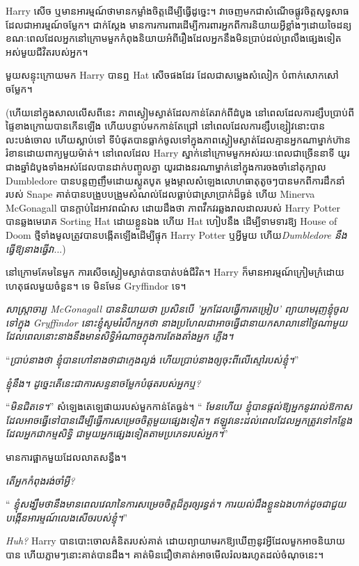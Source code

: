 {{{{{Harry សើច ឬមានអារម្មណ៍ថាមានកម្លាំងចិត្តដើម្បីធ្វើដូច្នេះ។ វាចេញមកជាសំណើចផ្លូវចិត្តសុទ្ធសាធ ដែលជាអារម្មណ៍ចម្លែក។ ជាក់ស្តែង មានការការពារដើម្បីការពារអ្នកពីការនិយាយអ្វីខ្លាំងៗដោយចៃដន្យ ខណៈពេលដែលអ្នកនៅក្រោមមួកកំពុងនិយាយអំពីរឿងដែលអ្នកនឹងមិនប្រាប់ដល់ព្រលឹងផ្សេងទៀតអស់មួយជីវិតរបស់អ្នក។

មួយសន្ទុះក្រោយមក Harry បានឮ Hat សើចផងដែរ ដែលជាសម្លេងសំលៀក បំពាក់សោកសៅចម្លែក។

(ហើយនៅក្នុងសាលលើសពីនេះ ភាពស្ងៀមស្ងាត់ដែលកាន់តែរាក់ពីដំបូង នៅពេលដែលការខ្សឹបប្រាប់ពីផ្ទៃខាងក្រោយបានកើនឡើង ហើយបន្ទាប់មកកាន់តែជ្រៅ នៅពេលដែលការខ្សឹបខ្សៀវនោះបានលះបង់ចោល ហើយស្លាប់ទៅ ទីបំផុតបានធ្លាក់ចូលទៅក្នុងភាពស្ងៀមស្ងាត់ដែលគ្មានអ្នកណាម្នាក់ហ៊ានរំខានដោយពាក្យមួយម៉ាត់។ នៅពេលដែល Harry ស្នាក់នៅក្រោមមួកអស់រយៈពេលជាច្រើននាទី យូរជាងឆ្នាំដំបូងទាំងអស់ដែលបានដាក់បញ្ចូលគ្នា យូរជាងនរណាម្នាក់នៅក្នុងការចងចាំនៅតុក្បាល Dumbledore បានបន្តញញឹមដោយស្លូតបូត ម្តងម្កាលសំឡេងលោហធាតុតូចៗបានមកពីការដឹកនាំរបស់ Snape គាត់បានបង្រួបបង្រួមសំណល់ដែលធ្លាប់ជាស្រាប្រាក់ដ៏ធ្ងន់ ហើយ Minerva McGonagall បានក្តាប់ដៃអាវពណ៌ស ដោយដឹងថា ភាពវឹកវរឆ្លងរាលដាលរបស់ Harry Potter បានឆ្លងមេរោគ Sorting Hat ដោយខ្លួនឯង ហើយ Hat ហៀបនឹង ដើម្បីទាមទារឱ្យ House of Doom ថ្មីទាំងមូលត្រូវបានបង្កើតឡើងដើម្បីផ្ទុក Harry Potter ឬអ្វីមួយ ហើយ\emph{Dumbledore នឹងធ្វើឱ្យនាងធ្វើវា}...)

នៅក្រោមគែមនៃមួក ការសើចស្ងៀមស្ងាត់បានបាត់បង់ជីវិត។ Harry ក៏​មាន​អារម្មណ៍​ក្រៀមក្រំ​ដោយ​ហេតុផល​មួយ​ចំនួន។ ទេ មិនមែន Gryffindor ទេ។

\emph{សាស្រ្តាចារ្យ McGonagall បាននិយាយថា ប្រសិនបើ 'អ្នកដែលធ្វើការតម្រៀប' ព្យាយាមរុញខ្ញុំចូលទៅក្នុង Gryffindor នោះខ្ញុំសូមរំលឹកអ្នកថា នាងប្រហែលជាអាចធ្វើជានាយកសាលានៅថ្ងៃណាមួយ ដែលពេលនោះនាងនឹងមានសិទ្ធិអំណាចក្នុងការតែងតាំងអ្នក ភ្លើង។ }

“\emph{ប្រាប់នាងថា ខ្ញុំបានហៅនាងថាជាក្មេងល្ងង់ ហើយប្រាប់នាងឲ្យចុះពីលើស្មៅរបស់ខ្ញុំ។}”

\emph{ខ្ញុំនឹង។ ដូច្នេះ​តើ​នេះ​ជា​ការ​សន្ទនា​ចម្លែក​បំផុត​របស់​អ្នក​ឬ?}

“\emph{មិនជិតទេ។}” សំឡេងតេឡេផាយរបស់មួកកាន់តែធ្ងន់។ “\emph{ មែនហើយ ខ្ញុំបានផ្តល់ឱ្យអ្នកនូវរាល់ឱកាសដែលអាចធ្វើទៅបានដើម្បីធ្វើការសម្រេចចិត្តមួយផ្សេងទៀត។ ឥឡូវនេះដល់ពេលដែលអ្នកត្រូវទៅកន្លែងដែលអ្នកជាកម្មសិទ្ធិ ជាមួយអ្នកផ្សេងទៀតតាមប្រភេទរបស់អ្នក។}”

មានការផ្អាកមួយដែលលាតសន្ធឹង។

\emph{តើអ្នកកំពុងរង់ចាំអ្វី?}

“\emph{ ខ្ញុំ​សង្ឃឹម​ថា​នឹង​មាន​ពេល​វេលា​នៃ​ការ​សម្រេច​ចិត្ត​ដ៏​គួរ​ឲ្យ​រន្ធត់។ ការ​យល់​ដឹង​ខ្លួន​ឯង​ហាក់​ដូច​ជា​ជួយ​បង្កើន​អារម្មណ៍​លេង​សើច​របស់​ខ្ញុំ។}”

\emph{Huh?} Harry បានបោះចោលគំនិតរបស់គាត់ ដោយព្យាយាមរកឱ្យឃើញនូវអ្វីដែលមួកអាចនិយាយបាន ហើយភ្លាមៗនោះគាត់បានដឹង។ គាត់​មិន​ជឿ​ថា​គាត់​អាច​មើល​រំលង​រហូត​ដល់​ចំណុច​នេះ។

}}}}}
